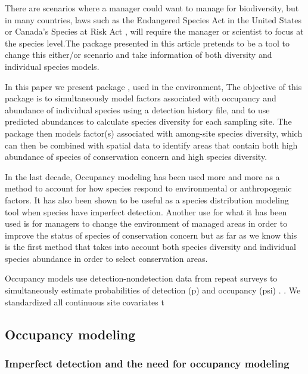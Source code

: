 \documentclass[article]{jss}
\begin{document}
There are scenarios where a manager could want to manage for
biodiversity, but in many countries, laws such as the Endangered Species
Act in the United States or Canada's Species at Risk Act
\citep{congress1973endangered, waples2013tale}, will require the manager
or scientist to focus at the species level.The package presented in this
article pretends to be a tool to change this either/or scenario and take
information of both diversity and individual species models.

In this paper we present package , used in the
 environment, The objective of this package is to
simultaneously model factors associated with occupancy and abundance of
individual species using a detection history file, and to use predicted
abundances to calculate species diversity for each sampling site. The
package then models factor(s) associated with among-site species
diversity, which can then be combined with spatial data to identify
areas that contain both high abundance of species of conservation
concern and high species diversity.

In the last decade, Occupancy modeling has been used more and more as a
method to account for how species respond to environmental or
anthropogenic factors. It has also been shown to be useful as a species
distribution modeling tool when species have imperfect detection.
Another use for what it has been used is for managers to change the
environment of managed areas in order to improve the status of species
of conservation concern
\citep{mackenzie_estimating_2002, mackenzie2006occupancy} but as far as
we know this is the first method that takes into account both species
diversity and individual species abundance in order to select
conservation areas.

Occupancy models use detection-nondetection data from repeat surveys to
simultaneously estimate probabilities of detection (p) and occupancy
(psi) \citep{mackenzie2006occupancy}. \citep{burnham2003model}. We
standardized all continuous site covariates t

\subsection{Occupancy modeling}\label{occupancy-modeling}

\subsubsection{Imperfect detection and the need for occupancy
modeling}\label{imperfect-detection-and-the-need-for-occupancy-modeling}
\end{document}
